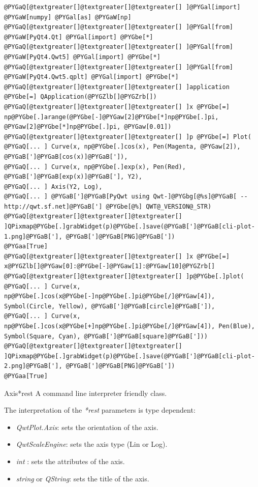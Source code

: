 \documentclass[a4paper,10pt,english]{manual}
\begin{document}
\begin{Verbatim}[commandchars=@\[\]]
@PYGaQ[@textgreater[]@textgreater[]@textgreater[] ]@PYGal[import] @PYGaW[numpy] @PYGal[as] @PYGaW[np]
@PYGaQ[@textgreater[]@textgreater[]@textgreater[] ]@PYGal[from] @PYGaW[PyQt4.Qt] @PYGal[import] @PYGbe[*]
@PYGaQ[@textgreater[]@textgreater[]@textgreater[] ]@PYGal[from] @PYGaW[PyQt4.Qwt5] @PYGal[import] @PYGbe[*]
@PYGaQ[@textgreater[]@textgreater[]@textgreater[] ]@PYGal[from] @PYGaW[PyQt4.Qwt5.qplt] @PYGal[import] @PYGbe[*]
@PYGaQ[@textgreater[]@textgreater[]@textgreater[] ]application @PYGbe[=] QApplication(@PYGZlb[]@PYGZrb[])
@PYGaQ[@textgreater[]@textgreater[]@textgreater[] ]x @PYGbe[=] np@PYGbe[.]arange(@PYGbe[-]@PYGaw[2]@PYGbe[*]np@PYGbe[.]pi, @PYGaw[2]@PYGbe[*]np@PYGbe[.]pi, @PYGaw[0.01])
@PYGaQ[@textgreater[]@textgreater[]@textgreater[] ]p @PYGbe[=] Plot(
@PYGaQ[... ] Curve(x, np@PYGbe[.]cos(x), Pen(Magenta, @PYGaw[2]), @PYGaB[']@PYGaB[cos(x)]@PYGaB[']),
@PYGaQ[... ] Curve(x, np@PYGbe[.]exp(x), Pen(Red), @PYGaB[']@PYGaB[exp(x)]@PYGaB['], Y2),
@PYGaQ[... ] Axis(Y2, Log),
@PYGaQ[... ] @PYGaB[']@PYGaB[PyQwt using Qwt-]@PYGbg[@%s]@PYGaB[ -- http://qwt.sf.net]@PYGaB['] @PYGbe[@%] QWT@_VERSION@_STR)
@PYGaQ[@textgreater[]@textgreater[]@textgreater[] ]QPixmap@PYGbe[.]grabWidget(p)@PYGbe[.]save(@PYGaB[']@PYGaB[cli-plot-1.png]@PYGaB['], @PYGaB[']@PYGaB[PNG]@PYGaB['])
@PYGaa[True]
@PYGaQ[@textgreater[]@textgreater[]@textgreater[] ]x @PYGbe[=] x@PYGZlb[]@PYGaw[0]:@PYGbe[-]@PYGaw[1]:@PYGaw[10]@PYGZrb[]
@PYGaQ[@textgreater[]@textgreater[]@textgreater[] ]p@PYGbe[.]plot(
@PYGaQ[... ] Curve(x, np@PYGbe[.]cos(x@PYGbe[-]np@PYGbe[.]pi@PYGbe[/]@PYGaw[4]), Symbol(Circle, Yellow), @PYGaB[']@PYGaB[circle]@PYGaB[']),
@PYGaQ[... ] Curve(x, np@PYGbe[.]cos(x@PYGbe[+]np@PYGbe[.]pi@PYGbe[/]@PYGaw[4]), Pen(Blue), Symbol(Square, Cyan), @PYGaB[']@PYGaB[square]@PYGaB[']))
@PYGaQ[@textgreater[]@textgreater[]@textgreater[] ]QPixmap@PYGbe[.]grabWidget(p)@PYGbe[.]save(@PYGaB[']@PYGaB[cli-plot-2.png]@PYGaB['], @PYGaB[']@PYGaB[PNG]@PYGaB['])
@PYGaa[True]
\end{Verbatim}

\hypertarget{PyQt4.Qwt5.qplt.Axis}{}\begin{classdesc}{Axis}{*rest}
A command line interpreter friendly class.

The interpretation of the \emph{*rest} parameters is type dependent:
\begin{itemize}
\item {} 
\emph{QwtPlot.Axis}: sets the orientation of the axis.

\item {} 
\emph{QwtScaleEngine}: sets the axis type (Lin or Log).

\item {} 
\emph{int} : sets the attributes of the axis.

\item {} 
\emph{string} or \emph{QString}: sets the title of the axis.

\end{itemize}
\end{classdesc}
\end{document}
